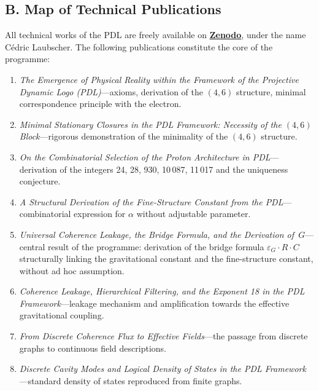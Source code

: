 \documentclass[12pt, a4paper, openright]{book}
\begin{document}
\subsection*{B. Map of Technical Publications}

All technical works of the PDL are freely available on \href{https://zenodo.org}{\textbf{Zenodo}}, under the name Cédric Laubscher. The following publications constitute the core of the programme:

\begin{enumerate}

\item \textit{The Emergence of Physical Reality within the Framework of the Projective Dynamic Logo (PDL)}---axioms, derivation of the $(4,6)$ structure, minimal correspondence principle with the electron.

\item \textit{Minimal Stationary Closures in the PDL Framework: Necessity of the $(4,6)$ Block}---rigorous demonstration of the minimality of the $(4,6)$ structure.

\item \textit{On the Combinatorial Selection of the Proton Architecture in PDL}---derivation of the integers 24, 28, 930, 10\,087, 11\,017 and the uniqueness conjecture.

\item \textit{A Structural Derivation of the Fine-Structure Constant from the PDL}---combinatorial expression for $\alpha$ without adjustable parameter.

\item \textit{Universal Coherence Leakage, the Bridge Formula, and the Derivation of~$G$}---central result of the programme: derivation of the bridge formula $\varepsilon_G \cdot R \cdot C$ structurally linking the gravitational constant and the fine-structure constant, without ad hoc assumption.

\item \textit{Coherence Leakage, Hierarchical Filtering, and the Exponent 18 in the PDL Framework}---leakage mechanism and amplification towards the effective gravitational coupling.

\item \textit{From Discrete Coherence Flux to Effective Fields}---the passage from discrete graphs to continuous field descriptions.

\item \textit{Discrete Cavity Modes and Logical Density of States in the PDL Framework}---standard density of states reproduced from finite graphs.


\end{enumerate}
\end{document}
